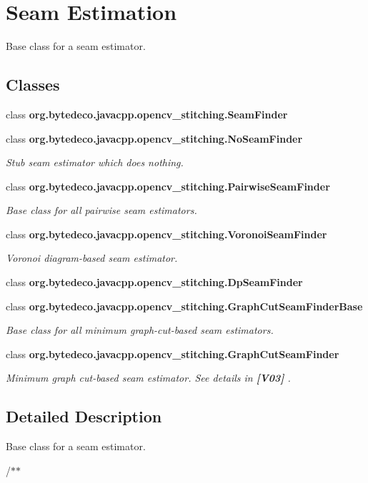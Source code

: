 \hypertarget{group__stitching__seam}{}\section{Seam Estimation}
\label{group__stitching__seam}


Base class for a seam estimator.  


\subsection*{Classes}
\begin{DoxyCompactItemize}
\item 
class {\bfseries org.\+bytedeco.\+javacpp.\+opencv\+\_\+stitching.\+Seam\+Finder}
\item 
class {\bfseries org.\+bytedeco.\+javacpp.\+opencv\+\_\+stitching.\+No\+Seam\+Finder}
\begin{DoxyCompactList}\small\item\em Stub seam estimator which does nothing. \end{DoxyCompactList}\item 
class {\bfseries org.\+bytedeco.\+javacpp.\+opencv\+\_\+stitching.\+Pairwise\+Seam\+Finder}
\begin{DoxyCompactList}\small\item\em Base class for all pairwise seam estimators. \end{DoxyCompactList}\item 
class {\bfseries org.\+bytedeco.\+javacpp.\+opencv\+\_\+stitching.\+Voronoi\+Seam\+Finder}
\begin{DoxyCompactList}\small\item\em Voronoi diagram-\/based seam estimator. \end{DoxyCompactList}\item 
class {\bfseries org.\+bytedeco.\+javacpp.\+opencv\+\_\+stitching.\+Dp\+Seam\+Finder}
\item 
class {\bfseries org.\+bytedeco.\+javacpp.\+opencv\+\_\+stitching.\+Graph\+Cut\+Seam\+Finder\+Base}
\begin{DoxyCompactList}\small\item\em Base class for all minimum graph-\/cut-\/based seam estimators. \end{DoxyCompactList}\item 
class {\bfseries org.\+bytedeco.\+javacpp.\+opencv\+\_\+stitching.\+Graph\+Cut\+Seam\+Finder}
\begin{DoxyCompactList}\small\item\em Minimum graph cut-\/based seam estimator. See details in {\bfseries [V03]} . \end{DoxyCompactList}\end{DoxyCompactItemize}


\subsection{Detailed Description}
Base class for a seam estimator. 

/$\ast$$\ast$ 